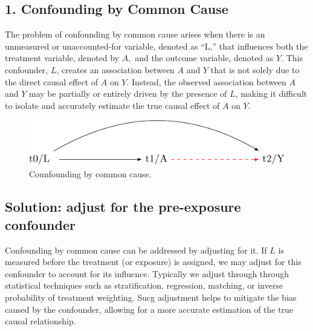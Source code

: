 \documentclass[
  singlecolumn]{report}
\begin{document}
\hypertarget{confounding-by-common-cause}{%
\subsection{1. Confounding by Common
Cause}\label{confounding-by-common-cause}}

The problem of confounding by common cause arises when there is an
unmeasured or unaccounted-for variable, denoted as ``L,'' that
influences both the treatment variable, denoted by \(A,\) and the
outcome variable, denoted as \(Y.\) This confounder, \(L\), creates an
association between \(A\) and \(Y\) that is not solely due to the direct
causal effect of \(A\) on \(Y\). Instead, the observed association
between \(A\) and \(Y\) may be partially or entirely driven by the
presence of \(L\), making it difficult to isolate and accurately
estimate the true causal effect of \(A\) on \(Y\).

\begin{figure}

{\centering \includegraphics[width=1\textwidth,height=\textheight]{causal-dags_files/figure-pdf/fig-dag-common-cause-1.pdf}

}

\caption{\label{fig-dag-common-cause}Counfounding by common cause.}

\end{figure}

\hypertarget{solution-adjust-for-the-pre-exposure-confounder}{%
\subsection{Solution: adjust for the pre-exposure
confounder}\label{solution-adjust-for-the-pre-exposure-confounder}}

Confounding by common cause can be addressed by adjusting for it. If
\(L\) is measured before the treatment (or exposure) is assigned, we may
adjust for this confounder to account for its influence. Typically we
adjust through through statistical techniques such as stratification,
regression, matching, or inverse probability of treatment weighting.
Sucg adjustment helps to mitigate the bias caused by the confounder,
allowing for a more accurate estimation of the true causal relationship.
\end{document}
